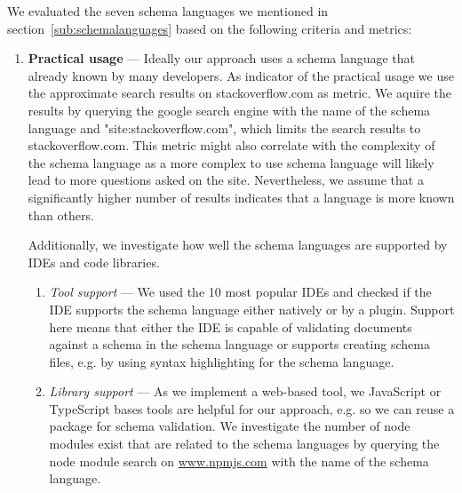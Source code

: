 \documentclass[lettersize,journal]{IEEEtran}
\begin{document}
We evaluated the seven schema languages we mentioned in section~\ref{sub:schemalanguages} based on the following criteria and metrics:
\begin{enumerate}
    \item \textbf{Practical usage} --- Ideally our approach uses a schema language that already known by many developers. 
    As indicator of the practical usage we use the approximate search results on stackoverflow.com as metric. 
    We aquire the results by querying the google search engine with the name of the schema language and "site:stackoverflow.com", which limits the search results to stackoverflow.com. 
    This metric might also correlate with the complexity of the schema language as a more complex to use schema language will likely lead to more questions asked on the site. Nevertheless, we assume that a significantly higher number of results indicates that a language is more known than others.

    Additionally, we investigate how well the schema languages are supported by IDEs and code libraries.
    \begin{enumerate}
        \item \textit{Tool support} --- We used the 10 most popular IDEs\cite{mostpopularides} and checked if the IDE supports the schema language either natively or by a plugin. Support here means that either the IDE is capable of validating documents against a schema in the schema language or supports creating schema files, e.g. by using syntax highlighting for the schema language.
        \item \textit{Library support} --- As we implement a web-based tool, we JavaScript or TypeScript bases tools are helpful for our approach, e.g. so we can reuse a package for schema validation. We investigate the number of node modules exist that are related to the schema languages by querying the node module search on \url{www.npmjs.com} with the name of the schema language.
        
    \end{enumerate}


\end{enumerate}
\end{document}
